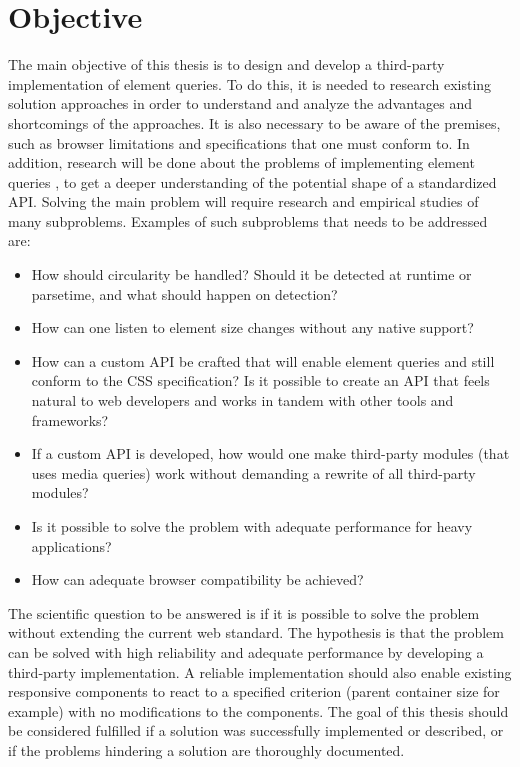 \documentclass[a4paper,11pt]{kth-mag}
\begin{document}
    \section{Objective}
      The main objective of this thesis is to design and develop a \gls{third-party} implementation of element queries.
      To do this, it is needed to research existing solution approaches in order to understand and analyze the advantages and shortcomings of the approaches.
      It is also necessary to be aware of the premises, such as \gls{browser} limitations and specifications that one must conform to.
      In addition, research will be done about the problems of implementing element queries , to get a deeper understanding of the potential shape of a standardized \gls{API}. 
      Solving the main problem will require research and empirical studies of many subproblems.
      Examples of such subproblems that needs to be addressed are:
      \begin{itemize}
        \item How should circularity be handled? Should it be detected at runtime or parsetime, and what should happen on detection?
        \item How can one listen to \gls{element} size changes without any \gls{native} support?
        \item How can a custom \gls{API} be crafted that will enable element queries and still conform to the \gls{CSS} specification? Is it possible to create an \gls{API} that feels natural to \gls{web} developers and works in tandem with other tools and frameworks?
        \item If a custom \gls{API} is developed, how would one make \gls{third-party} modules (that uses \gls{media queries}) work without demanding a rewrite of all \gls{third-party} modules? 
        \item Is it possible to solve the problem with adequate performance for heavy applications? 
        \item How can adequate \gls{browser} compatibility be achieved?
      \end{itemize}
      The scientific question to be answered is if it is possible to solve the problem  without extending the current \gls{web} standard. 
      The hypothesis is that the problem can be solved with high reliability and adequate performance by developing a \gls{third-party} implementation.
      A reliable implementation should also enable existing \gls{responsive} components to react to a specified criterion (parent container size for example) with no modifications to the components.
      The goal of this thesis should be considered fulfilled if a solution was successfully implemented or described, or if the problems hindering a solution are thoroughly documented.
\end{document}
